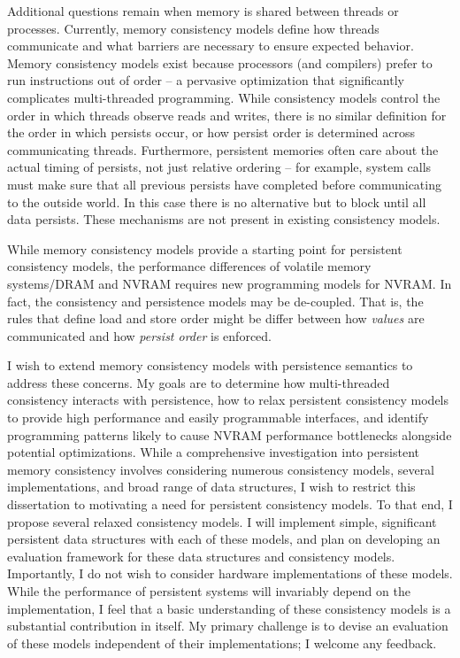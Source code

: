 Additional questions remain when memory is shared between threads or processes.
Currently, memory consistency models define how threads communicate and what barriers are necessary to ensure expected behavior.
Memory consistency models exist because processors (and compilers) prefer to run instructions out of order -- a pervasive optimization that significantly complicates multi-threaded programming.
While consistency models control the order in which threads observe reads and writes, there is no similar definition for the order in which persists occur, or how persist order is determined across communicating threads.
Furthermore, persistent memories often care about the actual timing of persists, not just relative ordering -- for example, system calls must make sure that all previous persists have completed before communicating to the outside world.
In this case there is no alternative but to block until all data persists.
These mechanisms are not present in existing consistency models.

While memory consistency models provide a starting point for persistent consistency models, the performance differences of volatile memory systems/DRAM and NVRAM requires new programming models for NVRAM.
In fact, the consistency and persistence models may be de-coupled.
That is, the rules that define load and store order might be differ between how \emph{values} are communicated and how \emph{persist order} is enforced.

I wish to extend memory consistency models with persistence semantics to address these concerns.
My goals are to determine how multi-threaded consistency interacts with persistence, how to relax persistent consistency models to provide high performance and easily programmable interfaces, and identify programming patterns likely to cause NVRAM performance bottlenecks alongside potential optimizations.
While a comprehensive investigation into persistent memory consistency involves considering numerous consistency models, several implementations, and broad range of data structures, I wish to restrict this dissertation to motivating a need for persistent consistency models.
To that end, I propose several relaxed consistency models.
I will implement simple, significant persistent data structures with each of these models, and plan on developing an evaluation framework for these data structures and consistency models.
Importantly, I do not wish to consider hardware implementations of these models.
While the performance of persistent systems will invariably depend on the implementation, I feel that a basic understanding of these consistency models is a substantial contribution in itself.
My primary challenge is to devise an evaluation of these models independent of their implementations; I welcome any feedback.

